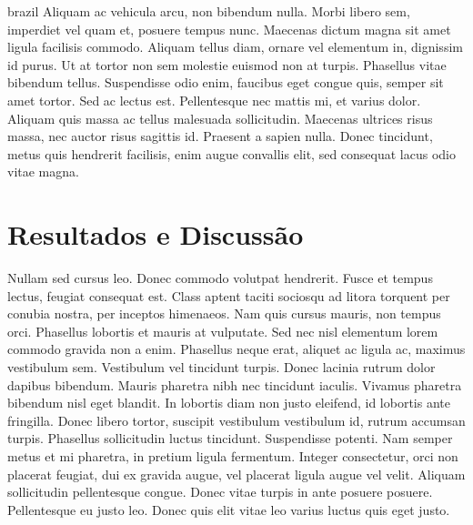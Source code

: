 \begin{otherlanguage*}{brazil}
    Aliquam ac vehicula arcu, non bibendum nulla. Morbi libero sem,
    imperdiet vel quam et, posuere tempus nunc. Maecenas dictum magna sit
    amet ligula facilisis commodo. Aliquam tellus diam, ornare vel elementum
    in, dignissim id purus. Ut at tortor non sem molestie euismod non at
    turpis. Phasellus vitae bibendum tellus. Suspendisse odio enim, faucibus
    eget congue quis, semper sit amet tortor. Sed ac lectus est.
    Pellentesque nec mattis mi, et varius dolor. Aliquam quis massa ac
    tellus malesuada sollicitudin. Maecenas ultrices risus massa, nec auctor
    risus sagittis id. Praesent a sapien nulla. Donec tincidunt, metus quis
    hendrerit facilisis, enim augue convallis elit, sed consequat lacus odio
    vitae magna.

    \section*{Resultados e Discussão}
    Nullam sed cursus leo. Donec commodo volutpat hendrerit. Fusce et tempus
    lectus, feugiat consequat est. Class aptent taciti sociosqu ad litora
    torquent per conubia nostra, per inceptos himenaeos. Nam quis cursus
    mauris, non tempus orci. Phasellus lobortis et mauris at vulputate. Sed
    nec nisl elementum lorem commodo gravida non a enim. Phasellus neque
    erat, aliquet ac ligula ac, maximus vestibulum sem. Vestibulum vel
    tincidunt turpis. Donec lacinia rutrum dolor dapibus bibendum. Mauris
    pharetra nibh nec tincidunt iaculis. Vivamus pharetra bibendum nisl eget
    blandit. In lobortis diam non justo eleifend, id lobortis ante
    fringilla.  Donec libero tortor, suscipit vestibulum vestibulum id,
    rutrum accumsan turpis. Phasellus sollicitudin luctus tincidunt.
    Suspendisse potenti. Nam semper metus et mi pharetra, in pretium ligula
    fermentum. Integer consectetur, orci non placerat feugiat, dui ex
    gravida augue, vel placerat ligula augue vel velit. Aliquam sollicitudin
    pellentesque congue. Donec vitae turpis in ante posuere posuere.
    Pellentesque eu justo leo. Donec quis elit vitae leo varius luctus quis
    eget justo.


\end{otherlanguage*}
